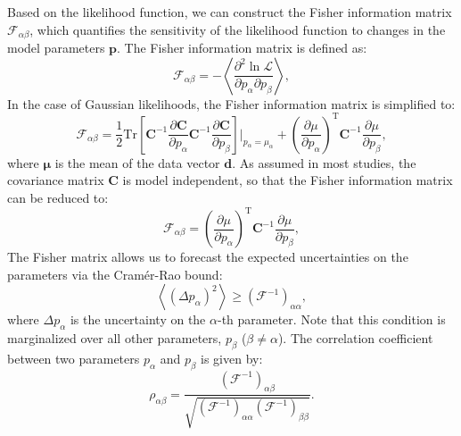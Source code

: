 Based on the likelihood function, we can construct the Fisher information matrix $\mathcal{F}_{\alpha\beta}$, which quantifies the sensitivity of the likelihood function to changes in the model parameters $\mathbf{p}$. The Fisher information matrix is defined as:
\begin{equation}
    \mathcal{F}_{\alpha\beta} = -\left\langle \frac{\partial^2 \ln \mathcal{L}}{\partial p_\alpha \partial p_\beta} \right\rangle,
\end{equation}
In the case of Gaussian likelihoods, the Fisher information matrix is simplified to:
\begin{equation}
    \mathcal{F}_{\alpha\beta} = \frac{1}{2} \mathrm{Tr} \left[ \mathbf{C}^{-1} \frac{\partial \mathbf{C}}{\partial p_\alpha} \mathbf{C}^{-1} \frac{\partial \mathbf{C}}{\partial p_\beta} \right]\Bigg|_{p_\alpha = \mu_\alpha} + \left(\frac{\partial \mu}{\partial p_\alpha}\right)^{\mathrm{T}} \mathbf{C}^{-1} \frac{\partial \mu}{\partial p_\beta},
\end{equation}
where $\mathbf{\mu}$ is the mean of the data vector $\mathbf{d}$. 
As assumed in most studies, the covariance matrix $\mathbf{C}$ is model independent, so that the Fisher information matrix can be reduced to:
\begin{equation}
    \mathcal{F}_{\alpha\beta} = \left(\frac{\partial \mu}{\partial p_\alpha}\right)^{\mathrm{T}} \mathbf{C}^{-1} \frac{\partial \mu}{\partial p_\beta},
\end{equation}
The Fisher matrix allows us to forecast the expected uncertainties on the parameters via the Cramér-Rao bound:
\begin{equation}
    \left\langle (\Delta p_\alpha)^2 \right\rangle \geq (\mathcal{F}^{-1})_{\alpha\alpha},
\end{equation}
where $\Delta p_\alpha$ is the uncertainty on the $\alpha$-th parameter. Note that this condition is marginalized over all other parameters, $p_\beta$ ($\beta \neq \alpha$). The correlation coefficient between two parameters $p_\alpha$ and $p_\beta$ is given by:
\begin{equation}
    \rho_{\alpha\beta} = \frac{(\mathcal{F}^{-1})_{\alpha\beta}}{\sqrt{(\mathcal{F}^{-1})_{\alpha\alpha} (\mathcal{F}^{-1})_{\beta\beta}}}.
\end{equation}

